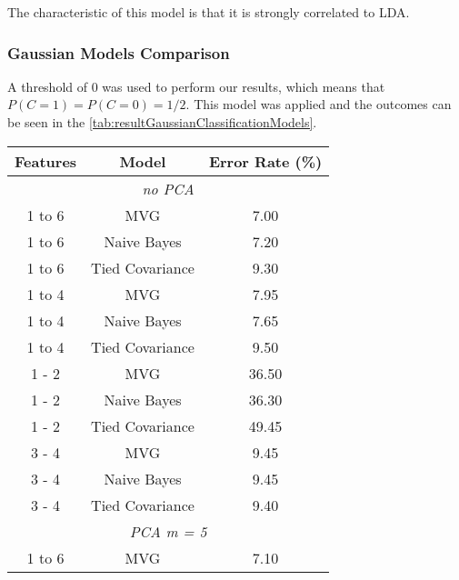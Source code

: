 The characteristic of this model is that it is strongly correlated to LDA.

\subsubsection{Gaussian Models Comparison}
\label{subsubsec:gaussianModelsComparison}
A threshold of \(0\) was used to perform our results, which means that \(P(C=1)=P(C=0)=1/2\). This model was applied and
the outcomes can be seen in the \autoref{tab:resultGaussianClassificationModels}.

\begin{table}[h]
    \centering
    \begin{tabular}{c c c}
        \toprule
        \textbf{Features} & \textbf{Model}  & \textbf{Error Rate} (\%) \\
        \midrule
        \multicolumn{3}{c}{\textit{no PCA}} \\
        \midrule
        1 to 6            & MVG             & 7.00                     \\
        1 to 6            & Naive Bayes     & 7.20                     \\
        1 to 6            & Tied Covariance & 9.30                     \\
        \midrule
        1 to 4            & MVG             & 7.95                     \\
        1 to 4            & Naive Bayes     & 7.65                     \\
        1 to 4            & Tied Covariance & 9.50                     \\
        \midrule
        1 - 2             & MVG             & 36.50                    \\
        1 - 2             & Naive Bayes     & 36.30                    \\
        1 - 2             & Tied Covariance & 49.45                    \\
        \midrule
        3 - 4             & MVG             & 9.45                     \\
        3 - 4             & Naive Bayes     & 9.45                     \\
        3 - 4             & Tied Covariance & 9.40                     \\
        \midrule
        \multicolumn{3}{c}{\textit{PCA m = 5}} \\
        \midrule
        1 to 6            & MVG             & 7.10                     \\

\end{tabular}
\end{table}
